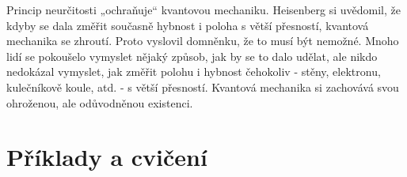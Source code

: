     Princip neurčitosti „ochraňuje“ kvantovou mechaniku. Heisenberg si uvědomil, že kdyby se dala
    změřit současně hybnost i poloha s větší přesností, kvantová mechanika se zhroutí. Proto
    vyslovil domněnku, že to musí být nemožné. Mnoho lidí se pokoušelo vymyslet nějaký způsob, jak
    by se to dalo udělat, ale nikdo nedokázal vymyslet, jak změřit polohu i hybnost čehokoliv -
    stěny, elektronu, kulečníkově koule, atd. - s větší přesností. Kvantová mechanika si zachovává
    svou ohroženou, ale odůvodněnou existenci.

  \section{Příklady a cvičení}\label{fyz:IchapXXXVIIsecIX}
   
